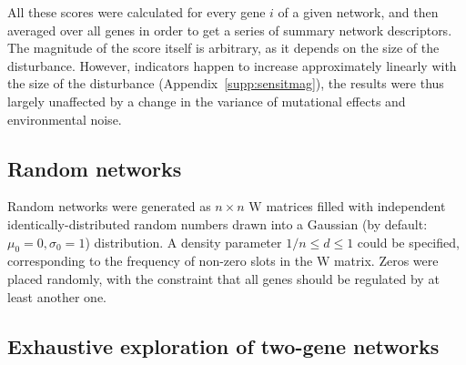 \documentclass[10pt,a4paper]{article}
\newcommand{\W}{\bm{\mathrm W}}
\newcommand{\SupMat}{Appendix~}
\begin{document}
All these scores were calculated for every gene $i$ of a given network, and then averaged over all genes in order to get a series of summary network descriptors. The magnitude of the score itself is arbitrary, as it depends on the size of the disturbance. However, indicators happen to increase approximately linearly with the size of the disturbance (\SupMat \ref{supp:sensitmag}), the results were thus largely unaffected by a change in the variance of mutational effects and environmental noise. 

\subsection{Random networks}

Random networks were generated as $n\times n$ $\bm{\mathrm W}$ matrices filled with independent identically-distributed random numbers drawn into a Gaussian (by default: $\mu_0 = 0, \sigma_0 = 1$) distribution.  A density parameter $1/n \leq d \leq 1$ could be specified, corresponding to the frequency of non-zero slots in the $\W$ matrix. Zeros were placed randomly, with the constraint that all genes should be regulated by at least another one. 

\subsection{Exhaustive exploration of two-gene networks}
\end{document}
